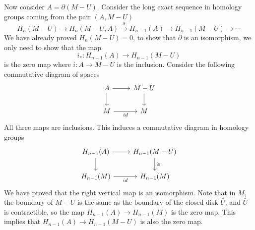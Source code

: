 \documentclass[letterpaper, 12pt]{article}
\begin{document}
\begin{solution}
\begin{enumerate}[(a)]
Now consider \(A=\partial (M-U)\). Consider the long exact sequence in homology groups coming from the pair \((A,M-U)\)
\[H_n(M-U)\rightarrow H_n(M-U,A)\xrightarrow{\partial}H_{n-1}(A)\rightarrow H_{n-1}(M-U)\rightarrow \cdots\]
We have already proved \(H_n(M-U)=0\), to show that \(\partial \) is an isomorphism, we only need to show that the map 
\[i_*:H_{n-1}(A)\rightarrow H_{n-1}(M-U)\] 
is the zero map where \(i:A\rightarrow M-U\) is the inclusion. Consider the following commutative diagram of spaces 
\[\begin{tikzcd}
	A & {M-U} \\
	M & M
	\arrow[from=1-1, to=1-2]
	\arrow[from=1-1, to=2-1]
	\arrow[from=1-2, to=2-2]
	\arrow["id"', from=2-1, to=2-2]
\end{tikzcd}\]
All three maps are inclusions. This induces a commutative diagram in homology groups 
\[\begin{tikzcd}
	{H_{n-1}(A)} & {H_{n-1}(M-U)} \\
	{H_{n-1}(M)} & {H_{n-1}(M)}
	\arrow[from=1-1, to=1-2]
	\arrow[from=1-1, to=2-1]
	\arrow["\cong", from=1-2, to=2-2]
	\arrow["id"', from=2-1, to=2-2]
\end{tikzcd}\]
We have proved that the right vertical map is an isomorphism. Note that in \(M\), the boundary of \(M-U\) is the same as the boundary of the closed disk \(\bar{U}\), and \(\bar{U}\) is contractible, so the map \(H_{n-1}(A)\rightarrow H_{n-1}(M)\) is the zero map. This implies that \(H_{n-1}(A)\rightarrow H_{n-1}(M-U)\) is also the zero map. 
\end{enumerate}
\end{solution}
\end{document}
